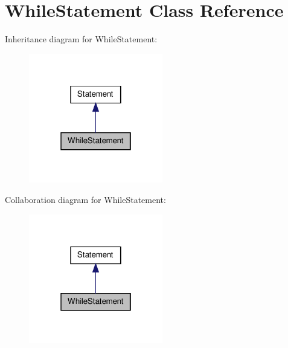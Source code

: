 \hypertarget{class_while_statement}{\section{While\-Statement Class Reference}
\label{class_while_statement}
}


Inheritance diagram for While\-Statement\-:
\nopagebreak
\begin{figure}[H]
\begin{center}
\leavevmode
\includegraphics[width=166pt]{class_while_statement__inherit__graph}
\end{center}
\end{figure}


Collaboration diagram for While\-Statement\-:
\nopagebreak
\begin{figure}[H]
\begin{center}
\leavevmode
\includegraphics[width=166pt]{class_while_statement__coll__graph}
\end{center}
\end{figure}
